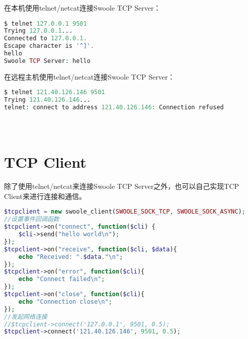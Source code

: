 \begin{compactitem}
\item 在本机使用telnet/netcat连接Swoole TCP Server：

\begin{lstlisting}[language=PHP]
$ telnet 127.0.0.1 9501
Trying 127.0.0.1...
Connected to 127.0.0.1.
Escape character is '^]'.
hello
Swoole TCP Server: hello
\end{lstlisting}

\item 在远程主机使用telnet/netcat连接Swoole TCP Server：

\begin{lstlisting}[language=PHP]
$ telnet 121.40.126.146 9501
Trying 121.40.126.146...
telnet: connect to address 121.40.126.146: Connection refused
\end{lstlisting}

\end{compactitem}




\begin{lstlisting}[language=PHP]

\end{lstlisting}




\begin{lstlisting}[language=PHP]

\end{lstlisting}




\begin{lstlisting}[language=PHP]

\end{lstlisting}







\section{TCP Client}

除了使用telnet/netcat来连接Swoole TCP Server之外，也可以自己实现TCP Client来进行连接和通信。


\begin{lstlisting}[language=PHP]
$tcpclient = new swoole_client(SWOOLE_SOCK_TCP, SWOOLE_SOCK_ASYNC);
//设置事件回调函数
$tcpclient->on("connect", function($cli) {
    $cli->send("hello world\n");
});
$tcpclient->on("receive", function($cli, $data){
    echo "Received: ".$data."\n";
});
$tcpclient->on("error", function($cli){
    echo "Connect failed\n";
});
$tcpclient->on("close", function($cli){
    echo "Connection close\n";
});
//发起网络连接
//$tcpclient->connect('127.0.0.1', 9501, 0.5);
$tcpclient->connect('121.40.126.146', 9501, 0.5);
\end{lstlisting}

